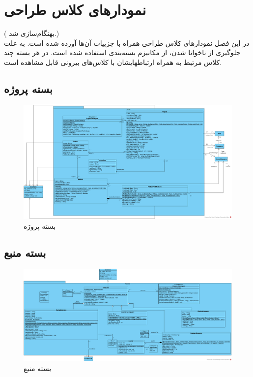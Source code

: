\chapter{نمودارهای کلاس طراحی}
({\color{red} بهنگام‌سازی شد.}) \\
در این فصل نمودارهای کلاس طراحی همراه با جزییات آن‌ها آورده شده است. به علت جلوگیری از ناخوانا شدن، از مکانیزم بسته‌بندی
استفاده شده است. در هر بسته چند کلاس مرتبط به همراه ارتباطهایشان با کلاس‌های بیرونی قابل مشاهده است.
\begin{landscape}
\section{بسته پروژه}
\begin{figure}[H]
	\centering
	\includegraphics[scale=0.4]{img/class-design/ProjectPackage}
	\caption{بسته پروژه}
\end{figure}


\section{بسته منبع}
\begin{figure}[H]
	\centering
	\includegraphics[scale=0.45]{img/class-design/ResourcePackage}
	\caption{بسته منیع}
\end{figure}



\end{landscape}
